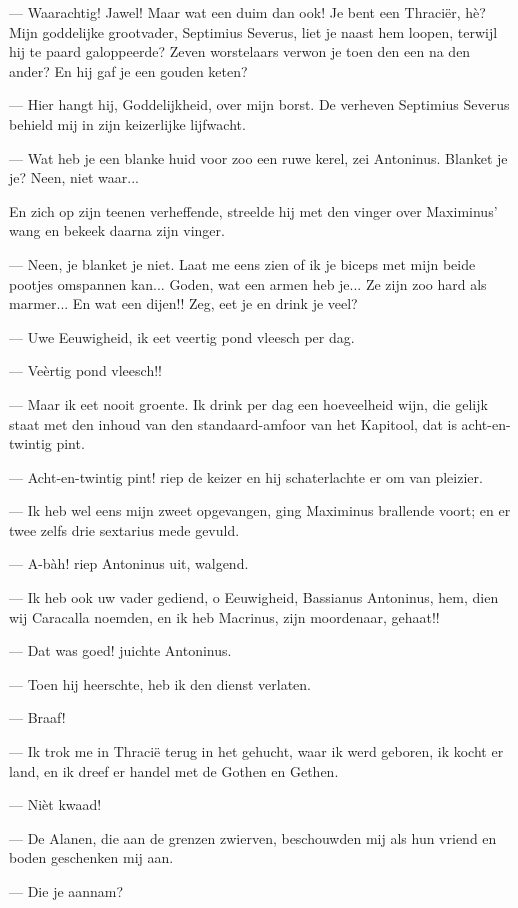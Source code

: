 \documentclass[a4paper, 12pt, oneside, dutch]{article}
\begin{document}
--- Waarachtig! Jawel! Maar wat een duim dan ook! Je bent een Thraciër, hè? Mijn goddelijke grootvader, Septimius Severus, liet je naast hem loopen, terwijl hij te paard galoppeerde? Zeven worstelaars verwon je toen den een na den ander? En hij gaf je een gouden keten?

--- Hier hangt hij, Goddelijkheid, over mijn borst. De verheven Septimius Severus behield mij in zijn keizerlijke lijfwacht.

--- Wat heb je een blanke huid voor zoo een ruwe kerel, zei Antoninus. Blanket je je? Neen, niet waar...

En zich op zijn teenen verheffende, streelde hij met den vinger over Maximinus' wang en bekeek daarna zijn vinger.

--- Neen, je blanket je niet. Laat me eens zien of ik je biceps met mijn beide pootjes omspannen kan... Goden, wat een armen heb je... Ze zijn zoo hard als marmer... En wat een dijen!! Zeg, eet je en drink je veel?

--- Uwe Eeuwigheid, ik eet veertig pond vleesch per dag.

--- Veèrtig pond vleesch!!

--- Maar ik eet nooit groente. Ik drink per dag een hoeveelheid wijn, die gelijk staat met den inhoud van den standaard-amfoor van het Kapitool, dat is acht-en-twintig pint.

--- Acht-en-twintig pint! riep de keizer en hij schaterlachte er om van pleizier.

--- Ik heb wel eens mijn zweet opgevangen, ging Maximinus brallende voort; en er twee zelfs drie sextarius mede gevuld.

--- A-bàh! riep Antoninus uit, walgend.

--- Ik heb ook uw vader gediend, o Eeuwigheid, Bassianus Antoninus, hem, dien wij Caracalla noemden, en ik heb Macrinus, zijn moordenaar, gehaat!!

--- Dat was goed! juichte Antoninus.

--- Toen hij heerschte, heb ik den dienst verlaten.

--- Braaf!

--- Ik trok me in Thracië terug in het gehucht, waar ik werd geboren, ik kocht er land, en ik dreef er handel met de Gothen en Gethen.

--- Nièt kwaad!

--- De Alanen, die aan de grenzen zwierven, beschouwden mij als hun vriend en boden geschenken mij aan.

--- Die je aannam?
\end{document}
